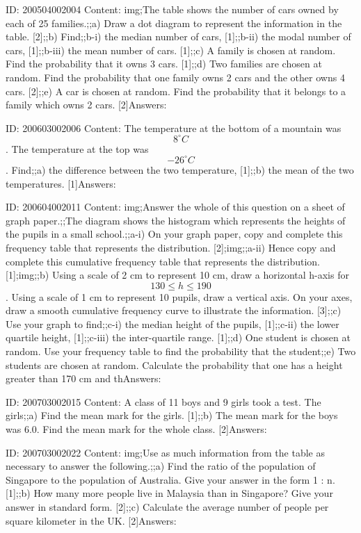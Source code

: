 \documentclass{article}
\begin{document}
ID: 200504002004
Content:
img;The table shows the number of cars owned by each of 25 families.;;a) Draw a dot diagram to represent the information in the table. [2];;b) Find;;b-i) the median number of cars, [1];;b-ii) the modal number of cars, [1];;b-iii) the mean number of cars. [1];;c) A family is chosen at random. Find the probability that it owns 3 cars. [1];;d) Two families are chosen at random. Find the probability that one family owns 2 cars and the other owns 4 cars. [2];;e) A car is chosen at random. Find the probability that it belongs to a family which owns 2 cars. [2]Answers:

ID: 200603002006
Content:
The temperature at the bottom of a mountain was $$8^{\circ}C$$. The temperature at the top was $$-26^{\circ}C$$. Find;;a) the difference between the two temperature, [1];;b) the mean of the two temperatures. [1]Answers:

ID: 200604002011
Content:
img;Answer the whole of this question on a sheet of graph paper.;;The diagram shows the histogram which represents the heights of the pupils in a small school.;;a-i) On your graph paper, copy and complete this frequency table that represents the	distribution. [2];img;;a-ii) Hence copy and complete this cumulative frequency table that represents the distribution. [1];img;;b) Using a scale of 2 cm to represent 10 cm, draw a horizontal h-axis for $$130\leq h\leq 190$$. Using a scale of 1 cm to represent 10 pupils, draw a vertical axis. On your axes, draw a smooth cumulative frequency curve to illustrate the information. [3];;c) Use your graph to find;;c-i) the median height of the pupils, [1];;c-ii) the lower quartile height, [1];;c-iii) the inter-quartile range. [1];;d) One student is chosen at random. Use your frequency table to find the probability that the student;;e) Two students are chosen at random. Calculate the probability that one has a height greater than 170 cm and thAnswers:

ID: 200703002015
Content:
A class of 11 boys and 9 girls took a test. The girls;;a) Find the mean mark for the girls. [1];;b) The mean mark for the boys was 6.0. Find the mean mark for the whole class. [2]Answers:

ID: 200703002022
Content:
img;Use as much information from the table as necessary to answer the following.;;a) Find the ratio of the population of Singapore to the population of Australia. Give your answer in the form 1 : n. [1];;b) How many more people live in Malaysia than in Singapore? Give your answer in standard form. [2];;c) Calculate the average number of people per square kilometer in the UK. [2]Answers:
\end{document}
